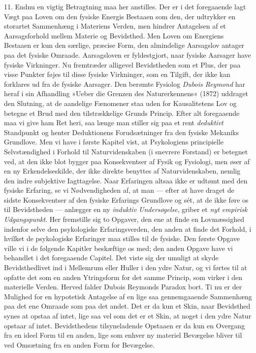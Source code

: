 \documentclass[12pt,a4paper,openany]{book}
\newcommand{\opage}[1]{\marginnote{\footnotesize\textit{[#1]}}}
\begin{document}
11. Endnu en vigtig Betragtning maa her anstilles. Der er i det
foregaaende lagt Vægt paa Loven om den fysiske Energis Bestaaen som den,
der udtrykker en storartet Sammenhæng i Materiens Verden, men hindrer
Antagelsen af et Aarsagsforhold mellem Materie og Bevidsthed. Men Loven
om Energiens Bestaaen er kun den særlige, præcise Form, den almindelige
Aarsagslov antager paa det fysiske Omraade. Aarsagsloven er
fyldestgjort, naar fysiske Aarsager have fysiske Virkninger. Nu
fremtræder alligevel Bevidstheden som et Plus, der paa visse Punkter
føjes til disse fysiske Virkninger, som en Tilgift, der ikke kan
forklares ud fra de fysiske Aarsager. Den berømte Fysiolog \emph{Dubois
Reymond}
\opage{99}har heraf i sin Afhandling »Ueber die Grenzen des
Naturerkennens« (1872) uddraget den Slutning, at de aandelige Fænomener
staa uden for Kausalitetens Lov og betegne et Brud med den
tilstrækkelige Grunds Princip. Efter alt foregaaende maa vi give ham Ret
heri, saa længe man stiller sig paa et rent \emph{deduktivt} Standpunkt
og henter Deduktionens Forudsætninger fra den fysiske Mekaniks
Grundlove. Men vi have i første Kapitel vist, at Psykologiens
principielle Selvstændighed i Forhold til Naturvidenskaben (i snevrere
Forstand) er betegnet ved, at den ikke blot bygger paa Konsekventser af
Fysik og Fysiologi, men øser af en ny Erkendelseskilde, der ikke direkte
benyttes af Naturvidenskaben, nemlig den indre subjektive Iagttagelse.
Naar Erfaringen altsaa ikke er udtømt med den fysiske Erfaring, se vi
Nødvendigheden af, at man --- efter at have draget de sidste
Konsekventser af den fysiske Erfarings Grundlove og sét, at de ikke føre
os til Bevidstheden --- anlægger en ny \emph{induktiv Undersøgelse},
griber et \emph{nyt empirisk Udgangspunkt}. Her fremstille sig to
Opgaver, den ene at finde en Lovmæssighed indenfor selve den
psykologiske Erfaringsverden, den anden at finde det Forhold, i hvilket
de psykologiske Erfaringer maa stilles til de fysiske. Den første Opgave
ville vi i de følgende Kapitler beskæftige os med; den anden Opgave have
vi behandlet i det foregaaende Capitel. Det viste sig der umuligt at
skyde Bevidsthedlivet ind i Mellemrum eller Huller i den ydre Natur, og
vi førtes til at opfatte det som en anden Ytringsform for det samme
Princip, som virker i den materielle Verden. Herved falder Dubois
Reymonds Paradox bort. Ti nu er der Mulighed for en hypotetisk Antagelse
af en lige saa gennemgaaende Sammenhæng paa det ene Omraade som paa det
andet. Det er da kun et Skin, naar Bevidsthed synes at opstaa af intet,
lige saa vel som det er et Skin, at noget i den ydre Natur opstaar af
intet. Bevidsthedens tilsyneladende Opstaaen er da kun en Overgang fra
en ideel Form til en anden, lige som enhver ny materiel Bevægelse bliver
til ved Omsætning fra en anden Form for Bevægelse.
\end{document}
